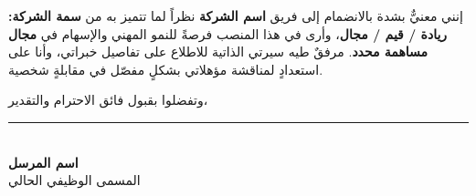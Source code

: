 \documentclass[12pt,a4paper]{article}
\newcommand{\contactsep}{\,\textbar\,}
\begin{document}
إنني معنيٌّ بشدة بالانضمام إلى فريق \textbf{اسم الشركة} نظراً لما تتميز به من \textbf{سمة الشركة: ريادة / قيم / مجال}، وأرى في هذا المنصب فرصةً للنمو المهني والإسهام في \textbf{مجال مساهمة محدد}. مرفقٌ طيه سيرتي الذاتية للاطلاع على تفاصيل خبراتي، وأنا على استعدادٍ لمناقشة مؤهلاتي بشكلٍ مفصّل في مقابلةٍ شخصية.

\vspace{0.5em}
\begin{flushright}
وتفضلوا بقبول فائق الاحترام والتقدير،
\end{flushright}

\vspace{2em}

\begin{flushright}
\rule{5cm}{0.4pt}\\[0.3em]
\textbf{اسم المرسل}\\[0.2em]
المسمى الوظيفي الحالي\\[0.2em]
 \contactsep {}
\end{flushright}
\end{document}
